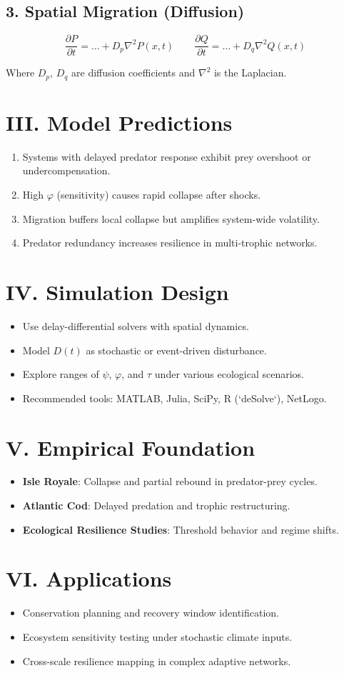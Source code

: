 \documentclass[12pt]{article}
\begin{document}
\subsection*{3. Spatial Migration (Diffusion)}

\[
\frac{\partial P}{\partial t} = \dots + D_p \nabla^2 P(x, t)
\quad\quad
\frac{\partial Q}{\partial t} = \dots + D_q \nabla^2 Q(x, t)
\]

Where $D_p$, $D_q$ are diffusion coefficients and $\nabla^2$ is the Laplacian.

\section*{III. Model Predictions}

\begin{enumerate}
  \item Systems with delayed predator response exhibit prey overshoot or undercompensation.
  \item High $\varphi$ (sensitivity) causes rapid collapse after shocks.
  \item Migration buffers local collapse but amplifies system-wide volatility.
  \item Predator redundancy increases resilience in multi-trophic networks.
\end{enumerate}

\section*{IV. Simulation Design}

\begin{itemize}
  \item Use delay-differential solvers with spatial dynamics.
  \item Model $D(t)$ as stochastic or event-driven disturbance.
  \item Explore ranges of $\psi$, $\varphi$, and $\tau$ under various ecological scenarios.
  \item Recommended tools: MATLAB, Julia, SciPy, R (`deSolve`), NetLogo.
\end{itemize}

\section*{V. Empirical Foundation}

\begin{itemize}
  \item \textbf{Isle Royale}: Collapse and partial rebound in predator-prey cycles.
  \item \textbf{Atlantic Cod}: Delayed predation and trophic restructuring.
  \item \textbf{Ecological Resilience Studies}: Threshold behavior and regime shifts.
\end{itemize}

\section*{VI. Applications}

\begin{itemize}
  \item Conservation planning and recovery window identification.
  \item Ecosystem sensitivity testing under stochastic climate inputs.
  \item Cross-scale resilience mapping in complex adaptive networks.
\end{itemize}
\end{document}
